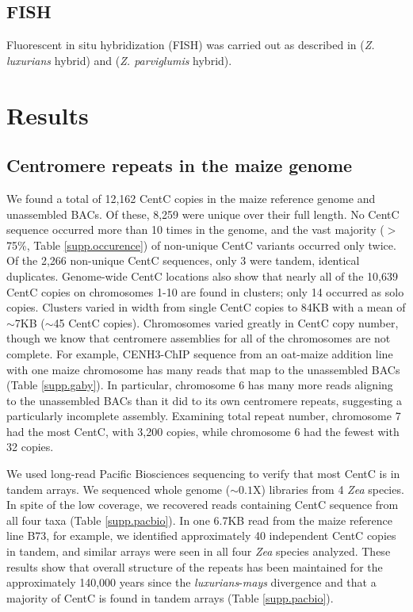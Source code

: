 \subsection*{FISH}

Fluorescent in situ hybridization (FISH) was carried out as described in \citet{kato2004paint} (\emph{Z. luxurians} hybrid) and \citet{Shi2010} (\emph{Z. parviglumis} hybrid). 

\section*{Results}
\label{results}

\subsection*{Centromere repeats in the maize genome}

We found a total of 12,162 CentC copies in the maize reference genome and unassembled BACs.  
Of these, 8,259 were unique over their full length. 
No CentC sequence occurred more than 10 times in the genome, and the vast majority ($>$75\%, Table \ref{supp.occurence}) of non-unique CentC variants occurred only twice.  
Of the 2,266 non-unique CentC sequences, only 3 were tandem, identical duplicates.  
Genome-wide CentC locations also show that nearly all of the 10,639 CentC copies on chromosomes 1-10 are found in clusters; only 14 occurred as solo copies.  
Clusters varied in width from single CentC copies to 84KB with a mean of $\sim$7KB ($\sim$45 CentC copies). 
Chromosomes varied greatly in CentC copy number, though we know that centromere assemblies for all of the chromosomes are not complete.   
For example, CENH3-ChIP sequence from an oat-maize addition line with one maize chromosome \citep{kynast2001} has many reads that map to the unassembled BACs (Table \ref{supp.gaby}).  
In particular, chromosome 6 has many more reads aligning to the unassembled BACs than it did to its own centromere repeats, suggesting a particularly incomplete assembly.  
Examining total repeat number, chromosome 7 had the most CentC, with 3,200 copies, while chromosome 6 had the fewest with 32 copies.

We used long-read Pacific Biosciences sequencing to verify that most CentC is in tandem arrays. We sequenced whole genome ($\sim 0.1$X) libraries from 4 \emph{Zea} species.  In spite of the low coverage, we recovered reads containing CentC sequence from all four taxa (Table \ref{supp.pacbio}).  In one 6.7KB read from the maize reference line B73, for example, we identified approximately 40 independent CentC copies in tandem, and similar arrays were seen in all four \emph{Zea} species analyzed.  These results show that overall structure of the repeats has been maintained for the approximately 140,000 years since the \emph{luxurians}-\emph{mays} divergence \citep{Hanson1996,  Ross-Ibarra2009} and that a majority of CentC is found in tandem arrays (Table \ref{supp.pacbio}).

